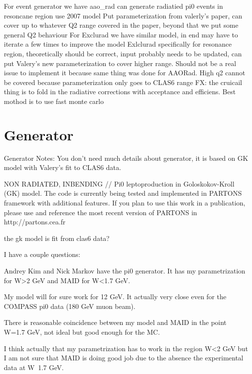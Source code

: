     For event generator we have aao\_rad can generate radiatied pi0 events in resoncane region use 2007 model
    Put parameterization from valerly’s paper, can cover up to whatever Q2 range covered in the paper, beyond that we put some general Q2 behaviour
    For Exclurad we have similar model, in end may have to iterate a few times to improve the model
    Exlclurad specifically for resonance region, theoretically should be correct, input probably needs to be updated, can put Valery’s new parameterization to cover higher range. Should not be a real issue to implement it because same thing was done for AAORad. High q2 cannot be covered because parameterization only goes to CLAS6 range
    FX: the cruicail thing is to fold in the radiative corrections with acceptance and efficiens. Best mothod is to use fast monte carlo




\section{Generator}
Generator Notes:
You don't need much details about generator, it is based on GK model with Valery's fit to CLAS6 data.

NON RADIATED, INBENDING
// Pi0 leptoproduction in Goloskokov-Kroll (GK) model. The code is currently being tested and implemented in PARTONS framework with additional features. If you plan to use this work in a publication, please use and reference the most recent version of PARTONS in http://partons.cea.fr 

the gk model is fit from clas6 data?

I have a couple questions:

Andrey Kim and Nick Markov have the pi0 generator. It has my parametrization for W>2 GeV and MAID for W<1.7 GeV.

My model will for sure work for 12 GeV. It actually very close even for the COMPASS pi0 data (180 GeV muon beam).

There is reasonable coincidence between my model and MAID in the point W=1.7 GeV, not ideal but good enough for the MC.

I think actually that my parametrization has to work in the region W<2 GeV but I am not sure that MAID is doing good job due to the absence the experimental data at W~1.7 GeV. 





\iffalse
NOTES TO SELF:
physics motivation
data sets before event selection
PID
exclusive cuts
results to show
1 slide of what needs to go from here to cross section
\fi

